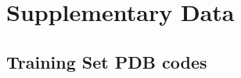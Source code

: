 \chapter{Supplementary Data}
\label{app:suppl}


\pagestyle{fancy}
\fancyhf{}
\fancyfoot[RO, LE]{\thepage}

\setcounter{page}{6}

\section{Training Set PDB codes}

